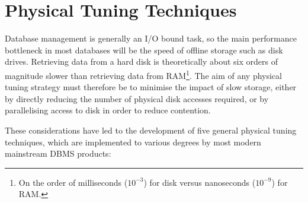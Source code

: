 \documentclass{llncs}
\begin{document}
\section{Physical Tuning Techniques}
\label{sec-techniques}

Database management is generally an I/O bound task, so the main
performance bottleneck in most databases will be the speed of offline
storage such as disk drives. Retrieving data from a hard disk is
theoretically about six orders of magnitude slower than retrieving data
from RAM\footnote{On the order of milliseconds (\(10^{-3}\)) for disk
versus nanoseconds (\(10^{-9}\)) for RAM.}. The aim of any physical
tuning strategy must therefore be to minimise the impact of slow
storage, either by directly reducing the number of physical disk
accesses required, or by parallelising access to disk in order to reduce
contention.

These considerations have led to the development of five general
physical tuning techniques, which are implemented to various degrees by
most modern mainstream DBMS products:
\end{document}
